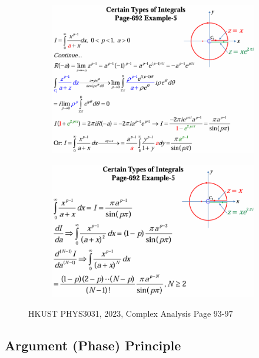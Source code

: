 \documentclass[10pt]{article}
\begin{document}
\begin{figure}[h]
\begin{subfigure}[b]{0.28\textwidth}
	\end{subfigure}
	\begin{subfigure}[b]{0.28\textwidth}
		\centering
		\includegraphics[width=\textwidth]{img3-9}
	\end{subfigure}
	\begin{subfigure}[b]{0.28\textwidth}
		\centering
		\includegraphics[width=\textwidth]{img3-10}
	\end{subfigure}
	\caption{HKUST PHYS3031, 2023, Complex Analysis Page 93-97}
\end{figure}

\newpage

\subsection{Argument (Phase) Principle}
\end{document}
